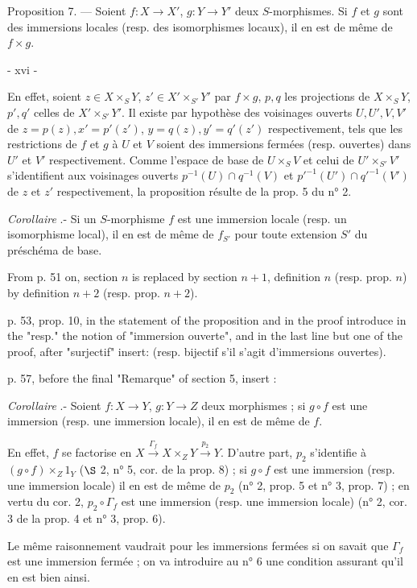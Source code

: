 Proposition 7. — Soient $f: X \to X'$, $g: Y \to Y'$ deux $S$-morphismes. Si $f$ et $g$ sont des immersions locales (resp. des isomorphismes locaux), il en est de même de $f \times g$.

\newpage


- xvi -

En effet, soient $z \in X \times_S Y$, $z' \in X' \times_{S'} Y'$ par $f \times g$, $p, q$ les projections de $X \times_S Y$, $p', q'$ celles de $X' \times_{S'} Y'$. Il existe par hypothèse des voisinages ouverts $U, U', V, V'$ de $z=p(z), x'=p'(z')$, $y=q(z), y'=q'(z')$ respectivement, tels que les restrictions de $f$ et $g$ à $U$ et $V$ soient des immersions fermées (resp. ouvertes) dans $U'$ et $V'$ respectivement. Comme l'espace de base de $U \times_S V$ et celui de $U' \times_{S'} V'$ s'identifient aux voisinages ouverts $p^{-1}(U) \cap q^{-1}(V)$ et $p'^{-1}(U') \cap q'^{-1}(V')$ de $z$ et $z'$ respectivement, la proposition résulte de la prop. 5 du n° 2.

\emph{Corollaire} .- Si un $S$-morphisme $f$ est une immersion locale (resp. un isomorphisme local), il en est de même de $f_{S'}$ pour toute extension $S'$ du préschéma de base.

From p. 51 on, section $n$ is replaced by section $n+1$, definition $n$ (resp. prop. $n$) by definition $n+2$ (resp. prop. $n+2$).

p. 53, prop. 10, in the statement of the proposition and in the proof introduce in the "resp." the notion of "immersion ouverte", and in the last line but one of the proof, after "surjectif" insert: (resp. bijectif s'il s'agit d'immersions ouvertes).

p. 57, before the final "Remarque" of section 5, insert :

\emph{Corollaire} .- Soient $f : X \to Y$, $g : Y \to Z$ deux morphismes ; si $g \circ f$ est une immersion (resp. une immersion locale), il en est de même de $f$.

En effet, $f$ se factorise en $X \xrightarrow{\Gamma_f} X \times_Z Y \xrightarrow{p_2} Y$. D'autre part, $p_2$ s'identifie à $(g \circ f) \times_Z 1_Y$ ($\S$ 2, n° 5, cor. de la prop. 8) ; si $g \circ f$ est une immersion (resp. une immersion locale) il en est de même de $p_2$ (n° 2, prop. 5 et n° 3, prop. 7) ; en vertu du cor. 2, $p_2 \circ \Gamma_f$ est une immersion (resp. une immersion locale) (n° 2, cor. 3 de la prop. 4 et n° 3, prop. 6).

Le même raisonnement vaudrait pour les immersions fermées si on savait que $\Gamma_f$ est une immersion fermée ; on va introduire au n° 6 une condition assurant qu'il en est bien ainsi.

